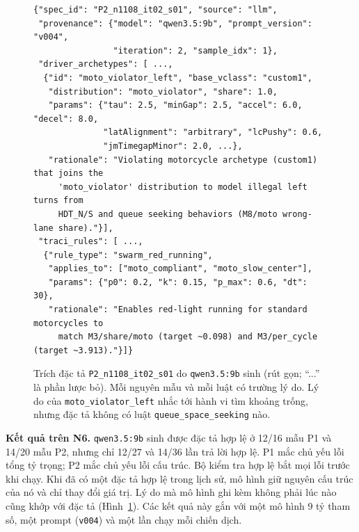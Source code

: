 \documentclass[../main.tex]{subfiles}
\begin{document}
\begin{figure}[!htbp]
\centering
\begin{minipage}{0.95\textwidth}
\begin{lstlisting}[basicstyle=\ttfamily\scriptsize, breaklines=true, frame=single, columns=fullflexible]
{"spec_id": "P2_n1108_it02_s01", "source": "llm",
 "provenance": {"model": "qwen3.5:9b", "prompt_version": "v004",
                "iteration": 2, "sample_idx": 1},
 "driver_archetypes": [ ...,
  {"id": "moto_violator_left", "base_vclass": "custom1",
   "distribution": "moto_violator", "share": 1.0,
   "params": {"tau": 2.5, "minGap": 2.5, "accel": 6.0, "decel": 8.0,
              "latAlignment": "arbitrary", "lcPushy": 0.6,
              "jmTimegapMinor": 2.0, ...},
   "rationale": "Violating motorcycle archetype (custom1) that joins the
     'moto_violator' distribution to model illegal left turns from
     HDT_N/S and queue seeking behaviors (M8/moto wrong-lane share)."}],
 "traci_rules": [ ...,
  {"rule_type": "swarm_red_running",
   "applies_to": ["moto_compliant", "moto_slow_center"],
   "params": {"p0": 0.2, "k": 0.15, "p_max": 0.6, "dt": 30},
   "rationale": "Enables red-light running for standard motorcycles to
     match M3/share/moto (target ~0.098) and M3/per_cycle (target ~3.913)."}]}
\end{lstlisting}
\end{minipage}
\caption{Trích đặc tả \texttt{P2\_n1108\_it02\_s01} do \texttt{qwen3.5:9b} sinh (rút gọn; ``...'' là phần lược bỏ). Mỗi nguyên mẫu và mỗi luật có trường lý do. Lý do của \texttt{moto\_violator\_left} nhắc tới hành vi tìm khoảng trống, nhưng đặc tả không có luật \texttt{queue\_space\_seeking} nào.}
\label{lst:p2_spec_n6}
\end{figure}

\textbf{Kết quả trên N6.} \texttt{qwen3.5:9b} sinh được đặc tả hợp lệ ở 12/16 mẫu P1 và 14/20 mẫu P2, nhưng chỉ 12/27 và 14/36 lần trả lời hợp lệ. P1 mắc chủ yếu lỗi tổng tỷ trọng; P2 mắc chủ yếu lỗi cấu trúc. Bộ kiểm tra hợp lệ bắt mọi lỗi trước khi chạy. Khi đã có một đặc tả hợp lệ trong lịch sử, mô hình giữ nguyên cấu trúc của nó và chỉ thay đổi giá trị. Lý do mà mô hình ghi kèm không phải lúc nào cũng khớp với đặc tả (Hình~\ref{lst:p2_spec_n6}). Các kết quả này gắn với một mô hình 9 tỷ tham số, một prompt (\texttt{v004}) và một lần chạy mỗi chiến dịch.
\end{document}
